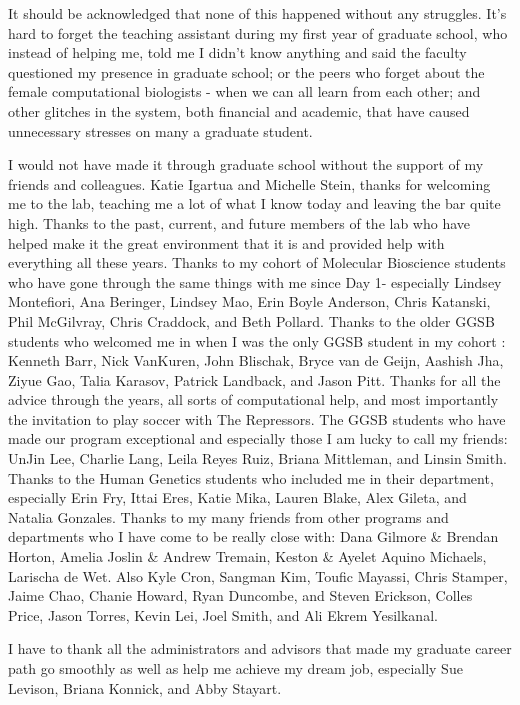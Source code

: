 It should be acknowledged that none of this happened without any struggles. It's hard to forget the teaching assistant during my first year of graduate school, who instead of helping me, told me I didn't know anything and said the faculty questioned my presence in graduate school; or the peers who forget about the female computational biologists - when we can all learn from each other; and other glitches in the system, both financial and academic, that have caused unnecessary stresses on many a graduate student.

I would not have made it through graduate school without the support of my friends and colleagues. Katie Igartua and Michelle Stein, thanks for welcoming me to the lab, teaching me a lot of what I know today and leaving the bar quite high. Thanks to the past, current, and future members of the lab who have helped make it the great environment that it is and provided help with everything all these years. Thanks to my cohort of Molecular Bioscience students who have gone through the same things with me since Day 1- especially Lindsey Montefiori, Ana Beringer, Lindsey Mao, Erin Boyle Anderson, Chris Katanski, Phil McGilvray, Chris Craddock, and Beth Pollard. Thanks to the older GGSB students who welcomed me in when I was the only GGSB student in my cohort : Kenneth Barr, Nick VanKuren, John Blischak, Bryce van de Geijn, Aashish Jha, Ziyue Gao, Talia Karasov, Patrick Landback, and Jason Pitt. Thanks for all the advice through the years, all sorts of computational help, and most importantly the invitation to play soccer with The Repressors. The GGSB students who have made our program exceptional and especially those I am lucky to call my friends: UnJin Lee, Charlie Lang, Leila Reyes Ruiz, Briana Mittleman, and Linsin Smith. Thanks to the Human Genetics students who included me in their department, especially Erin Fry, Ittai Eres, Katie Mika, Lauren Blake, Alex Gileta, and Natalia Gonzales. 
Thanks to my many friends from other programs and departments who I have come to be really close with: Dana Gilmore \& Brendan Horton, Amelia Joslin \& Andrew Tremain, Keston \& Ayelet Aquino Michaels, Larischa de Wet. Also Kyle Cron, Sangman Kim, Toufic Mayassi, Chris Stamper, Jaime Chao, Chanie Howard, Ryan Duncombe, and Steven Erickson, Colles Price, Jason Torres, Kevin Lei, Joel Smith, and Ali Ekrem Yesilkanal. 

I have to thank all the administrators and advisors that made my graduate career path go smoothly as well as help me achieve my dream job, especially Sue Levison, Briana Konnick, and Abby Stayart. 

